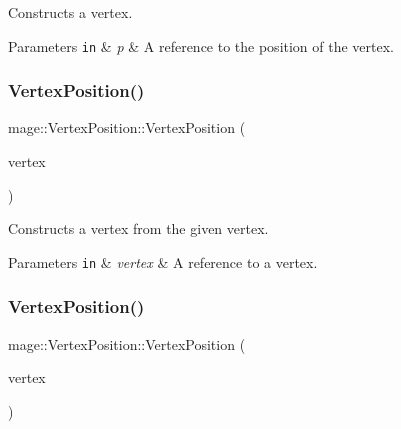 Constructs a vertex.


\begin{DoxyParams}[1]{Parameters}
\mbox{\tt in}  & {\em p} & A reference to the position of the vertex. \\
\hline
\end{DoxyParams}
\hypertarget{structmage_1_1_vertex_position_aa77211e4b45efed3d57f3170b9df6787}{}\label{structmage_1_1_vertex_position_aa77211e4b45efed3d57f3170b9df6787} 
\subsubsection{\texorpdfstring{Vertex\+Position()}{VertexPosition()}\hspace{0.1cm}{\footnotesize\ttfamily [3/4]}}
{\footnotesize\ttfamily mage\+::\+Vertex\+Position\+::\+Vertex\+Position (\begin{DoxyParamCaption}\item[{const \hyperlink{structmage_1_1_vertex_position}{Vertex\+Position} \&}]{vertex }\end{DoxyParamCaption})\hspace{0.3cm}{\ttfamily [default]}}

Constructs a vertex from the given vertex.


\begin{DoxyParams}[1]{Parameters}
\mbox{\tt in}  & {\em vertex} & A reference to a vertex. \\
\hline
\end{DoxyParams}
\hypertarget{structmage_1_1_vertex_position_ae00cb7667e411fefa4052b80a47ccfff}{}\label{structmage_1_1_vertex_position_ae00cb7667e411fefa4052b80a47ccfff} 
\subsubsection{\texorpdfstring{Vertex\+Position()}{VertexPosition()}\hspace{0.1cm}{\footnotesize\ttfamily [4/4]}}
{\footnotesize\ttfamily mage\+::\+Vertex\+Position\+::\+Vertex\+Position (\begin{DoxyParamCaption}\item[{\hyperlink{structmage_1_1_vertex_position}{Vertex\+Position} \&\&}]{vertex }\end{DoxyParamCaption})\hspace{0.3cm}{\ttfamily [default]}}

